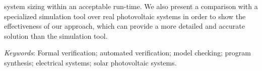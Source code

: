 system sizing within an acceptable run-time. We also present a comparison with a specialized simulation tool over real photovoltaic systems in order to show the effectiveness of our approach, which can provide a more detailed and accurate solution than the simulation tool.

\textit{Keywords}: Formal verification; automated verification; model checking; program synthesis; electrical systems; solar photovoltaic systems.
